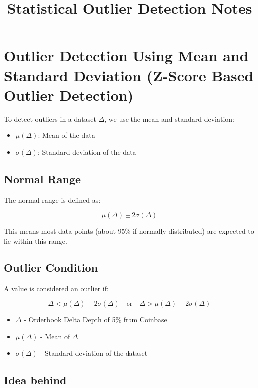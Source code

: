 \documentclass[12pt]{article}
\title{Statistical Outlier Detection Notes}
\author{}
\date{}
\begin{document}
\maketitle

\section*{Outlier Detection Using Mean and Standard Deviation (Z-Score Based Outlier Detection)}

To detect outliers in a dataset $\Delta$, we use the mean and standard deviation:

\begin{itemize}
    \item $\mu(\Delta)$: Mean of the data
    \item $\sigma(\Delta)$: Standard deviation of the data
\end{itemize}

\subsection*{Normal Range}

The normal range is defined as:

\[
\mu(\Delta) \pm 2\sigma(\Delta)
\]

This means most data points (about 95\% if normally distributed) are expected to lie within this range.

\subsection*{Outlier Condition}

A value is considered an outlier if:

\[
\Delta < \mu(\Delta) - 2\sigma(\Delta) \quad \text{or} \quad \Delta > \mu(\Delta) + 2\sigma(\Delta)
\]


\begin{itemize}
    \item $\Delta$ - Orderbook Delta Depth of 5\% from Coinbase
    \item $\mu(\Delta)$ - Mean of $\Delta$
    \item $\sigma(\Delta)$ - Standard deviation of the dataset
\end{itemize}







\newpage


\subsection*{Idea behind}
\end{document}
